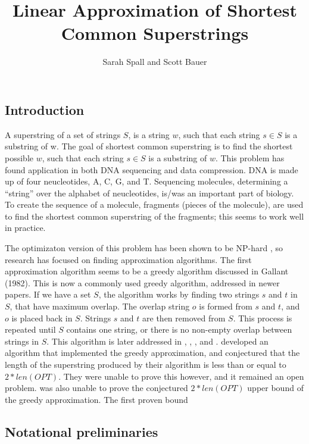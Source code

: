 \documentclass[letterpaper,11pt,titlepage]{article}
\title{Linear Approximation of Shortest Common Superstrings}
\author[1]{Sarah Spall and Scott Bauer}
\begin{document}
\maketitle
\newpage

\subsection*{Introduction}
A superstring of a set of strings $S$, is a string $w$, such that each string $s \in S$ is a substring
of w.  The goal of shortest common superstring is to find the shortest possible $w$, such that each 
string $s \in S$ is a substring of $w$. This problem has found application in both DNA sequencing 
and data compression.  DNA is made up of four neucleotides, A, C, G, and T.  Sequencing molecules,
determining a ``string'' over the alphabet of neucleotides, is/was an important part of biology.  To 
create the sequence of a molecule, fragments (pieces of the molecule), are used to find the shortest
common superstring of the fragments; this seems to work well in practice.  \cite{li1990towards}

 
The optimizaton version of this problem has been shown to be NP-hard \cite{blum1991linear} \cite{johngallant1980}, 
so research has focused on finding approximation algorithms.  The first approximation 
algorithm seems to be a greedy algorithm discussed in Gallant (1982). This is now a commonly used greedy 
algorithm, addressed in newer papers.  If we have a set $S$, the algorithm works by finding two strings $s$
and $t$ in $S$, that have maximum overlap.  The overlap string $o$ is formed from $s$ and $t$, and $o$ is
placed back in $S$.  Strings $s$ and $t$ are then removed from $S$.  This process is repeated until
$S$ contains one string, or there is no non-empty overlap between strings in $S$.  This algorithm is later
addressed in \cite{turner1989approximation}, \cite{tarhio1988greedy}, \cite{li1990towards}, and \cite{blum1991linear}.
\cite{tarhio1988greedy} developed an algorithm that implemented the greedy approximation, and conjectured that 
the length of the superstring produced by their algorithm is less than or equal to $2*len(OPT)$.  They were unable
to prove this however, and it remained an open problem.  \cite{turner1989approximation} was also unable to prove
the conjectured $2*len(OPT)$ upper bound of the greedy approximation.  The first proven bound 

\subsection*{Notational preliminaries}
\end{document}
